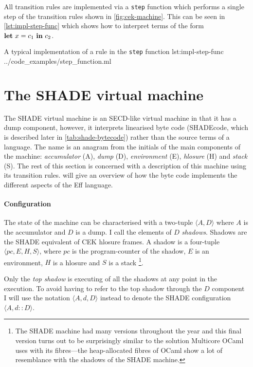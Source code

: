 \documentclass[class=article, crop=false]{standalone}
\begin{document}
All transition rules are implemented via a \lstinline{step} function which
performs a single step of the transition rules shown in
\autoref{fig:cek-machine}. This can be seen in \autoref{lst:impl-step-func}
which shows how to interpret terms of the form $\mathbf{let}\  x = c_1 \ \mathbf{in}\  c_2$.

{A typical implementation of a rule in the \lstinline{step} function}
{lst:impl-step-func}
{../code_examples/step_function.ml}

\section{The SHADE virtual machine}
\label{sec:shade-machine}

The SHADE virtual machine is an SECD-like virtual machine in that it has a dump
component, however, it interprets linearised byte code (SHADEcode, which is described later in
\autoref{tab:shade-bytecode}) rather than the source terms of a language. The
name is an anagram from the initials of the main components of the machine: 
\emph{accumulator} (A), \emph{dump} (D), \emph{environment} (E),
\emph{hlosure} (H) and \emph{stack} (S). The rest of this section is concerned
with a description of this machine using its transition rules.
 will give an overview of how the byte code
implements the different aspects of the Eff language.

\paragraph{Configuration}
The state of the machine can be characterised with a two-tuple
$\langle A, D \rangle$ where $A$ is the accumulator and $D$ is a dump. I call
the elements of $D$ \emph{shadows}. Shadows are the SHADE equivalent of CEK
hlosure frames. A shadow is a four-tuple $\langle pc, E, H, S \rangle$, where
$pc$ is the program-counter of the shadow, $E$ is an environment, $H$ is a
hlosure and $S$ is a stack
\footnote{The SHADE machine had many versions throughout the year and this
final version turns out to be surprisingly similar to the solution Multicore
OCaml uses with its fibres---the heap-allocated fibres of OCaml show a lot
of resemblance with the shadows of the SHADE machine.}.

Only the \emph{top shadow} is executing of all the shadows at any point in the
execution. To avoid having to refer to the top shadow through the $D$ component
I will use the notation $\langle A, d, D \rangle$ instead to denote the SHADE
configuration $\langle A, d :: D \rangle$.
\end{document}
